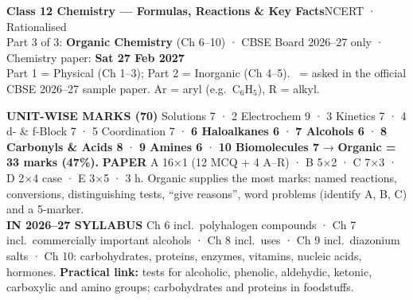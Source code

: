 \documentclass[9pt,a4paper]{extarticle}
\begin{document}
\footnotesize

\begin{tcolorbox}[enhanced,colback=navy,colframe=navy,arc=2pt,left=6pt,right=6pt,top=3pt,bottom=3pt]
\color{white}\sffamily
{\Large\bfseries Class 12 Chemistry — Formulas, Reactions \& Key Facts}\hfill{\small NCERT · Rationalised}\\[1pt]
{\footnotesize Part 3 of 3: \textbf{Organic Chemistry} (Ch 6--10) \;·\; CBSE Board 2026--27 only \;·\; Chemistry paper: \textbf{Sat 27 Feb 2027}}\\[2pt]
{\scriptsize Part 1 = Physical (Ch 1--3); Part 2 = Inorganic (Ch 4--5). \SQP\ = asked in the official CBSE 2026--27 sample paper. Ar = aryl (e.g.\ C$_6$H$_5$), R = alkyl.}
\end{tcolorbox}
\vspace{-1pt}
\noindent
\begin{tcolorbox}[enhanced,colback=navy!4,colframe=navy!60,boxrule=0.5pt,arc=1.5pt,left=3pt,right=3pt,top=1pt,bottom=1pt]
\scriptsize\sffamily\textbf{UNIT-WISE MARKS (70)}\rmfamily{} Solutions 7 · 2 Electrochem 9 · 3 Kinetics 7 · 4 d- \& f-Block 7 · 5 Coordination 7 ·
\textbf{\textcolor{uVI}{6 Haloalkanes 6}} · \textbf{\textcolor{uVII}{7 Alcohols 6}} · \textbf{\textcolor{uVIII}{8 Carbonyls \& Acids 8}} · \textbf{\textcolor{uIX}{9 Amines 6}} · \textbf{\textcolor{uX}{10 Biomolecules 7}}
\;→\; \textbf{Organic = 33 marks (47\%).}\quad
\sffamily\textbf{PAPER}\rmfamily\; A 16×1 (12 MCQ + 4 A--R) · B 5×2 · C 7×3 · D 2×4 case · E 3×5 · 3 h. Organic supplies the most marks: named reactions, conversions, distinguishing tests, ``give reasons'', word problems (identify A, B, C) and a 5-marker.\\
\sffamily\textbf{IN 2026--27 SYLLABUS}\rmfamily\; Ch 6 incl.\ polyhalogen compounds · Ch 7 incl.\ commercially important alcohols · Ch 8 incl.\ uses · Ch 9 incl.\ diazonium salts · Ch 10: carbohydrates, proteins, enzymes, vitamins, nucleic acids, hormones. \textbf{Practical link:} tests for alcoholic, phenolic, aldehydic, ketonic, carboxylic and amino groups; carbohydrates and proteins in foodstuffs.
\end{tcolorbox}
\end{document}
